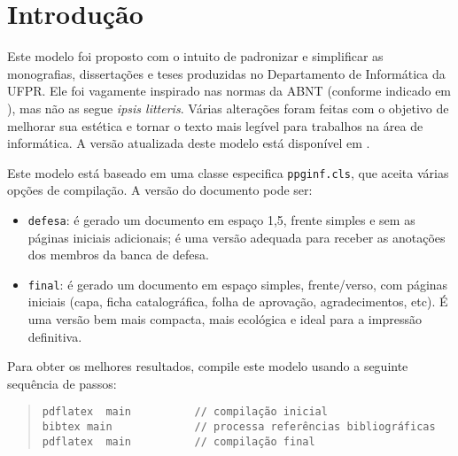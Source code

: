 \chapter{Introdução}



Este modelo foi proposto com o intuito de padronizar e simplificar as monografias, dissertações e teses produzidas no Departamento de Informática da UFPR. Ele foi vagamente inspirado nas normas da ABNT (conforme indicado em \cite{bibufpr15}), mas não as segue \emph{ipsis litteris}. Várias alterações foram feitas com o objetivo de melhorar sua estética e tornar o texto mais legível para trabalhos na área de informática. A versão atualizada deste modelo está disponível em \cite{maziero15}.

Este modelo está baseado em uma classe especifica \verb#ppginf.cls#, que aceita várias opções de compilação. A versão do documento pode ser:

\begin{itemize}

\item \verb#defesa#: é gerado um documento em espaço 1,5, frente simples e sem as páginas iniciais adicionais; é uma versão adequada para receber as anotações dos membros da banca de defesa.

\item \verb#final#: é gerado um documento em espaço simples, frente/verso, com páginas iniciais (capa, ficha catalográfica, folha de aprovação, agradecimentos, etc). É uma versão bem mais compacta, mais ecológica e ideal para a impressão definitiva.

\end{itemize}

Para obter os melhores resultados, compile este modelo usando a seguinte sequência de passos:

\begin{quote}
\begin{footnotesize}
\begin{verbatim}
pdflatex  main          // compilação inicial
bibtex main             // processa referências bibliográficas
pdflatex  main          // compilação final
\end{verbatim}
\end{footnotesize}
\end{quote}

